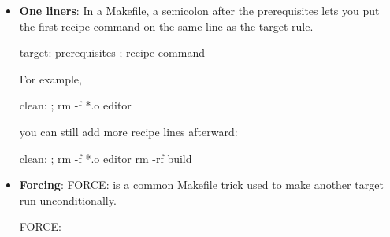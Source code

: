 \documentclass{report}
\begin{document}
\begin{itemize}
            \bigbreak \noindent 
            A rule is always expanded the same way, regardless of the form:
            \bigbreak \noindent 
            \begin{bashcode}
                immediate : immediate ; deferred
                    deferred
            \end{bashcode}
            \bigbreak \noindent 
            That is, the target and prerequisite sections are expanded immediately, and the recipe used to build the target is always deferred. This is true for explicit rules, pattern rules, suffix rules, static pattern rules, and simple prerequisite definitions.
        \item \textbf{One liners}: In a Makefile, a semicolon after the prerequisites lets you put the first recipe command on the same line as the target rule.
            \bigbreak \noindent 
            \begin{bashcode}
            target: prerequisites ; recipe-command
            \end{bashcode}
            \bigbreak \noindent 
            For example, 
            \bigbreak \noindent 
            \begin{bashcode}
            clean: ; rm -f *.o editor
            \end{bashcode}
            \bigbreak \noindent 
            you can still add more recipe lines afterward:
            \bigbreak \noindent 
            \begin{bashcode}
                clean: ; rm -f *.o editor
                    rm -rf build
            \end{bashcode}
        \item \textbf{Forcing}: FORCE: is a common Makefile trick used to make another target run unconditionally.
            \bigbreak \noindent 
            \begin{bashcode}
            FORCE:


\end{bashcode}
\end{itemize}
\end{document}
